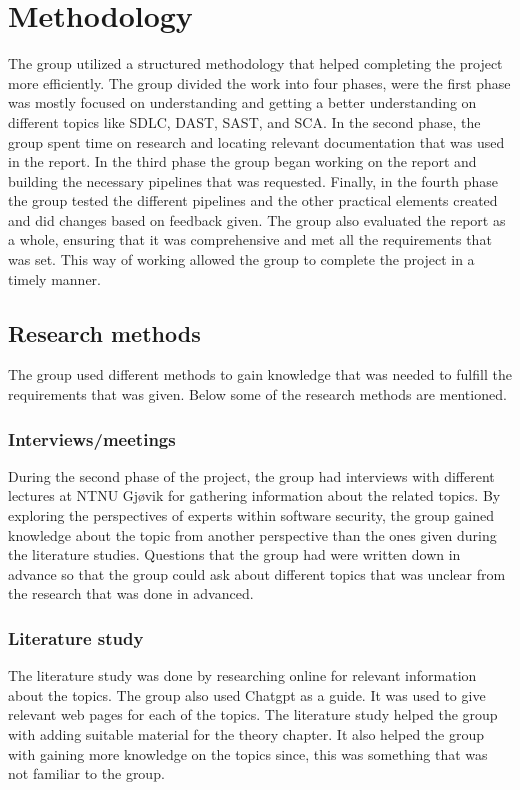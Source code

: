 \section{Methodology} %
The group utilized a structured methodology that helped completing the project more efficiently. The group divided the work into four phases, were the first phase was mostly focused on understanding and getting a better understanding on different topics like SDLC, DAST, SAST, and SCA. In the second phase, the group spent time on research and locating relevant documentation that was used in the report. In the third phase the group began working on the report and building the necessary pipelines that was requested. Finally, in the fourth phase the group tested the different pipelines and the other practical elements created and did changes based on feedback given. The group also evaluated the report as a whole, ensuring that it was comprehensive and met all the requirements that was set. This way of working allowed the group to complete the project in a timely manner. 
\newpage
\subsection{Research methods}
The group used different methods to gain knowledge that was needed to fulfill the requirements that was given. Below some of the research methods are mentioned. 

\subsubsection{Interviews/meetings}
During the second phase of the project, the group had interviews with different lectures at NTNU Gjøvik for gathering information about the related topics. By exploring the perspectives of experts within software security, the group gained knowledge about the topic from another perspective than the ones given during the literature studies. Questions that the group had were written down in advance so that the group could ask about different topics that was unclear from the research that was done in advanced.   

\subsubsection{Literature study}
The literature study was done by researching online for relevant information about the topics. The group also used Chatgpt as a guide. It was used to give relevant web pages for each of the topics. The literature study helped the group with adding suitable material for the theory chapter. It also helped the group with gaining more knowledge on the topics since, this was something that was not familiar to the group. 

